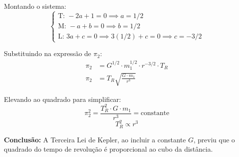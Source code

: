 Montando o sistema:
\[
\begin{cases}
\text{T: } -2a + 1 = 0 \implies a = 1/2 \\
\text{M: } -a + b = 0 \implies b = 1/2 \\
\text{L: } 3a + c = 0 \implies 3(1/2) + c = 0 \implies c = -3/2
\end{cases}
\]

Substituindo na expressão de $\pi_2$:
\begin{align*}
\pi_2 &= G^{1/2} \cdot m_1^{1/2} \cdot r^{-3/2} \cdot T_R \\
\pi_2 &= T_R \sqrt{\frac{G \cdot m_1}{r^3}}
\end{align*}

Elevando ao quadrado para simplificar:
\[ \pi_2^2 = \frac{T_R^2 \cdot G \cdot m_1}{r^3} = \text{constante} \]
\[ T_R^2 \propto r^3 \]

\textbf{Conclusão:} A Terceira Lei de Kepler, ao incluir a constante $G$, previu que o quadrado do tempo de revolução é proporcional ao cubo da distância.